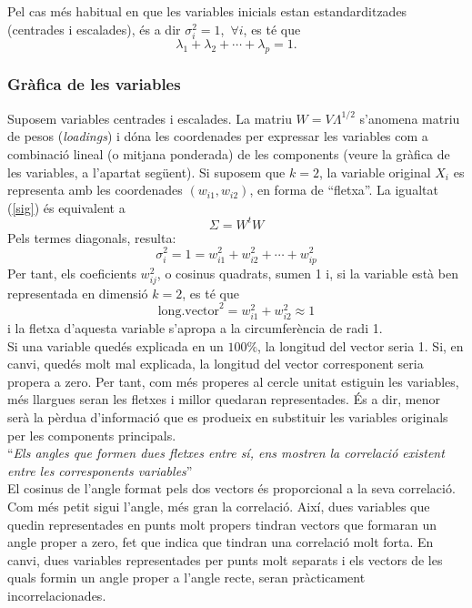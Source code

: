 \documentclass[english]{article}
\begin{document}
Pel cas més habitual en que les variables inicials estan
estandarditzades (centrades i escalades), és a dir $\sigma_i^2=1$,
$\,\forall i$, es té que
$$
\lambda_1+\lambda_2+\cdots + \lambda_p=1.
$$



\subsubsection{Gràfica de les variables}
\label{2.4.3}
 Suposem variables centrades i escalades. La matriu $W=V\Lambda^{1/2}$
s'anomena matriu de pesos (\emph{loadings})  i dóna les coordenades
per expressar  les variables com a combinació lineal (o mitjana
ponderada) de les components (veure la gràfica de les variables, a
l'apartat següent). Si suposem que $k=2$, la variable original $X_i$
 es representa amb les coordenades $(w_{i1},w_{i2})$, en forma de ``fletxa''. La igualtat
 (\ref{sig}) és equivalent a
 $$
 \Sigma=W^tW
 $$
 Pels termes diagonals, resulta:
 $$
 \sigma_i^2=1=w_{i1}^2+w_{i2}^2+\cdots+w_{ip}^2
 $$
Per tant, els coeficients $w_{ij}^2$, o cosinus quadrats, sumen 1 i,
si la variable està ben representada en dimensió $k=2$, es té que
$$
\mbox{long.vector}^2=w_{i1}^2+w_{i2}^2\approx 1
$$
i la fletxa d'aquesta variable s'apropa a la circumferència de radi
1.
\\

Si una variable quedés explicada en un $100\%$, la longitud del vector seria 1. Si, en canvi, quedés molt mal explicada, la longitud del vector corresponent seria propera a zero. Per tant, com més properes al cercle unitat estiguin les variables, més llargues seran les fletxes i millor quedaran representades. És a dir, menor serà la pèrdua d'informació que es produeix en substituir les variables originals per les components principals.
\\

``\textit{Els angles que formen dues fletxes entre sí, ens mostren la correlació existent entre les corresponents variables}''
\\

El cosinus de l'angle format pels dos vectors és proporcional a la seva correlació. Com
més petit sigui l'angle, més gran la correlació. Així, dues variables que quedin
representades en punts molt propers tindran vectors que formaran un angle proper a zero, fet que indica que tindran una correlació molt forta. En canvi, dues variables representades per punts molt separats i els vectors de les quals formin un angle proper a l'angle recte, seran pràcticament incorrelacionades.
\\
\end{document}
